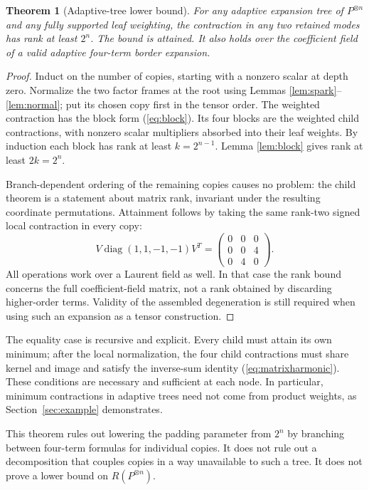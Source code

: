 \documentclass[11pt,letterpaper]{article}
\newtheorem{theorem}{Theorem}[section]
\theoremstyle{definition}\newtheorem{definition}[theorem]{Definition}
\theoremstyle{remark}\newtheorem{remark}[theorem]{Remark}
\DeclareMathOperator{\diag}{diag}
\begin{document}
\begin{theorem}[Adaptive-tree lower bound]\label{thm:adaptive}
For any adaptive expansion tree of $P^{\otimes n}$ and any fully supported leaf weighting, the contraction in any two retained modes has rank at least $2^n$. The bound is attained. It also holds over the coefficient field of a valid adaptive four-term border expansion.
\end{theorem}
\begin{proof}
Induct on the number of copies, starting with a nonzero scalar at depth zero. Normalize the two factor frames at the root using Lemmas \ref{lem:spark}--\ref{lem:normal}; put its chosen copy first in the tensor order. The weighted contraction has the block form (\ref{eq:block}). Its four blocks are the weighted child contractions, with nonzero scalar multipliers absorbed into their leaf weights. By induction each block has rank at least $k=2^{n-1}$. Lemma \ref{lem:block} gives rank at least $2k=2^n$.

Branch-dependent ordering of the remaining copies causes no problem: the child theorem is a statement about matrix rank, invariant under the resulting coordinate permutations. Attainment follows by taking the same rank-two signed local contraction in every copy:
\[
V\diag(1,1,-1,-1)V^T=
\begin{pmatrix}0&0&0\\0&0&4\\0&4&0\end{pmatrix}.
\]
All operations work over a Laurent field as well. In that case the rank bound concerns the full coefficient-field matrix, not a rank obtained by discarding higher-order terms. Validity of the assembled degeneration is still required when using such an expansion as a tensor construction.
\end{proof}

The equality case is recursive and explicit. Every child must attain its own minimum; after the local normalization, the four child contractions must share kernel and image and satisfy the inverse-sum identity (\ref{eq:matrixharmonic}). These conditions are necessary and sufficient at each node. In particular, minimum contractions in adaptive trees need not come from product weights, as Section~\ref{sec:example} demonstrates.

This theorem rules out lowering the padding parameter from $2^n$ by branching between four-term formulas for individual copies. It does not rule out a decomposition that couples copies in a way unavailable to such a tree. It does not prove a lower bound on $R(P^{\otimes n})$.
\end{document}
